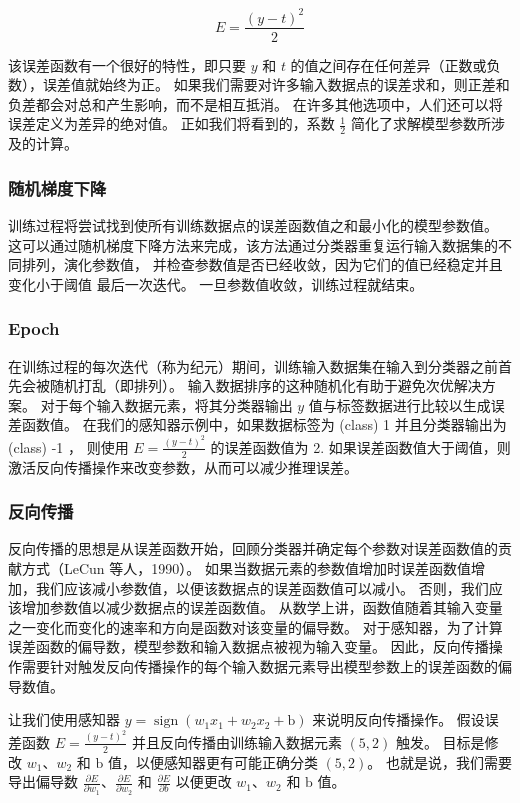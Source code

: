 $$
E=\frac{(y-t)^{2}}{2}
$$

该误差函数有一个很好的特性，即只要 $y$ 和 $t$ 的值之间存在任何差异（正数或负数），误差值就始终为正。 
如果我们需要对许多输入数据点的误差求和，则正差和负差都会对总和产生影响，而不是相互抵消。 
在许多其他选项中，人们还可以将误差定义为差异的绝对值。 
正如我们将看到的，系数 $\frac{1}{2}$ 简化了求解模型参数所涉及的计算。

\subsubsection{随机梯度下降}
训练过程将尝试找到使所有训练数据点的误差函数值之和最小化的模型参数值。 
这可以通过随机梯度下降方法来完成，该方法通过分类器重复运行输入数据集的不同排列，演化参数值，
并检查参数值是否已经收敛，因为它们的值已经稳定并且变化小于阈值 最后一次迭代。 一旦参数值收敛，训练过程就结束。

\subsubsection{Epoch}
在训练过程的每次迭代（称为纪元）期间，训练输入数据集在输入到分类器之前首先会被随机打乱（即排列）。 
输入数据排序的这种随机化有助于避免次优解决方案。 
对于每个输入数据元素，将其分类器输出 $y$ 值与标签数据进行比较以生成误差函数值。 
在我们的感知器示例中，如果数据标签为 (class) 1 并且分类器输出为 (class) -1 ，
则使用 $E=\frac{(y-t)^{2}}{2}$ 的误差函数值为 2. 
如果误差函数值大于阈值，则激活反向传播操作来改变参数，从而可以减少推理误差。

\subsubsection{反向传播}
反向传播的思想是从误差函数开始，回顾分类器并确定每个参数对误差函数值的贡献方式（LeCun 等人，1990）。 
如果当数据元素的参数值增加时误差函数值增加，我们应该减小参数值，以便该数据点的误差函数值可以减小。 
否则，我们应该增加参数值以减少数据点的误差函数值。 
从数学上讲，函数值随着其输入变量之一变化而变化的速率和方向是函数对该变量的偏导数。 
对于感知器，为了计算误差函数的偏导数，模型参数和输入数据点被视为输入变量。 
因此，反向传播操作需要针对触发反向传播操作的每个输入数据元素导出模型参数上的误差函数的偏导数值。

让我们使用感知器 $y=\operatorname{sign}\left(w_{1} x_{1}+w_{2} x_{2}+\mathrm{b}\right)$ 来说明反向传播操作。 
假设误差函数 $E=\frac{(y-t)^{2}}{2}$ 并且反向传播由训练输入数据元素 $(5,2)$ 触发。 
目标是修改 $w_{1}、w_{2}$ 和 $\mathrm{b}$ 值，以便感知器更有可能正确分类 $(5,2)$。 
也就是说，我们需要导出偏导数 $\frac{\partial E}{\partial w_{1}}、\frac{\partial E}{\partial w_{2}}$ 
和 $\frac {\partial E}{\partial b}$ 以便更改 $w_{1}、w_{2}$ 和 $\mathrm{b}$ 值。

